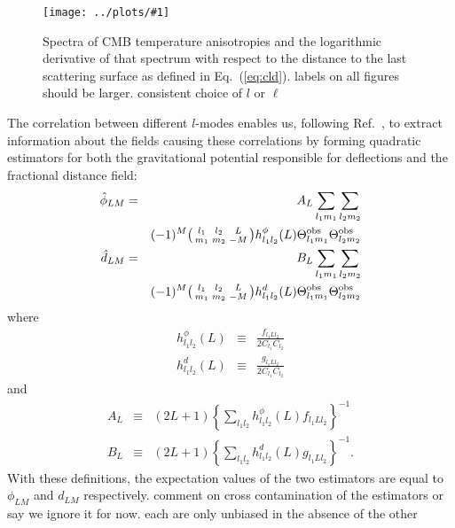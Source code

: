 \documentclass[prl,amsmath,amssymb,floatfix,superscriptaddress,nofootinbib,twocolumn]{revtex4-1}
\def\bea{\begin{eqnarray}}
\def\eea{\end{eqnarray}}
\newcommand{\ec}[1]{Eq.~(\ref{eq:#1})}
\newcommand{\eql}[1]{\label{eq:#1}}
\newcommand{\sfig}[2]{
\texttt{[image: ../plots/\#1]}
        }
\newcommand{\Sfig}[2]{
   \begin{figure}[thbp]
   \begin{center}
    \sfig{#1.pdf}{\columnwidth}
    \caption{{\small #2}}
    \label{fig:#1}
     \end{center}
   \end{figure}
}
\newcommand{\scott}[1]{{\color{darkgreen} #1}}
\newcommand{\peikai}[1]{{\color{blue} #1}}
\newcommand{\wh}[1]{{\color{red} #1}}
\begin{document}
\Sfig{TT1}{Spectra of CMB temperature anisotropies and the logarithmic derivative of that spectrum with respect to the distance to the last scattering surface as defined in \ec{cld}.
\wh{labels on all figures should be larger.  consistent choice of $l$ or $\ell$}}


The correlation between different $l$-modes enables us, following Ref.~\cite{Okamoto:2003zw}, to extract information about the fields causing these correlations by forming quadratic estimators for both the gravitational potential responsible for deflections and the fractional distance field:
\bea
\hat \phi_{LM} &=& A_L 
\sum_{l_1m_1}\sum_{l_2m_2} \nonumber \\  
&& (-1)^M  \bigl(\begin{smallmatrix} l_1 & l_2 & L \\ m_1 & m_2 & -M  \end{smallmatrix}\bigr) h^{\phi}_{l_1l_2}(L)  \tob_{l_1m_1} \tob_{l_2m_2} \\
\hat d_{LM} &=& B_{L} \sum_{l_1m_1}\sum_{l_2m_2}\nonumber \\
&& (-1)^M  \bigl(\begin{smallmatrix} l_1 & l_2 & L \\ m_1 & m_2 & -M  \end{smallmatrix}\bigr) h^{d}_{l_1l_2}(L)  \tob_{l_1m_1} \tob_{l_2m_2}\eql{distest}
\eea
where
\bea
h^{\phi}_{l_1l_2}(L)&\equiv& \frac{f_{l_1Ll_2}}{2C_{l_1}C_{l_2}} \\
h^{d}_{l_1l_2}(L)&\equiv& \frac{g_{l_1Ll_2}}{2C_{l_1}C_{l_2}}
\eea
and %
\bea
A_L &\equiv& 
(2L+1)
 \left\{ \sum_{l_1l_2} h^{\phi}_{l_1l_2}(L)f_{l_1Ll_2}\right\}^{-1}\\
B_L &\equiv& (2L+1) \left\{ \sum_{l_1l_2} h^{d}_{l_1l_2}(L)g_{l_1Ll_2}\right\}^{-1}.\eql{bt}
\eea 
With these definitions, the expectation values of the two estimators are equal to $\phi_{LM}$ and $d_{LM}$ respectively. \wh{comment on cross contamination of the estimators or say we
ignore it for now.
each are only unbiased in the absence of the other}
\end{document}
